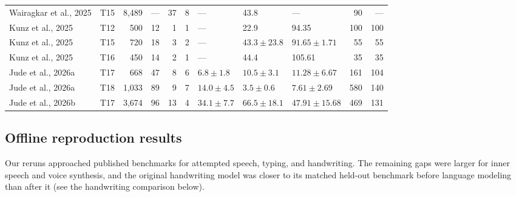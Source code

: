 \documentclass[11pt]{article}
\begin{document}
\begin{table}[t]
\begin{tabular}{@{}>{\raggedright\arraybackslash}p{3.50cm}lrrrrlllrr@{}}
Wairagkar et al., 2025 \cite{wairagkar2025} & T15 & 8{,}489 & --- & 37 & 8 & --- & 43.8 & --- & 90 & --- \\
Kunz et al., 2025 \cite{kunz2025} & T12 & 500 & 12 & 1 & 1 & --- & 22.9 & 94.35 & 100 & 100 \\
Kunz et al., 2025 \cite{kunz2025} & T15 & 720 & 18 & 3 & 2 & --- & $43.3{\pm}23.8$ & $91.65{\pm}1.71$ & 55 & 55 \\
Kunz et al., 2025 \cite{kunz2025} & T16 & 450 & 14 & 2 & 1 & --- & 44.4 & 105.61 & 35 & 35 \\
Jude et al., 2026a \cite{jude2026typing} & T17 & 668 & 47 & 8 & 6 & $6.8{\pm}1.8$ & $10.5{\pm}3.1$ & $11.28{\pm}6.67$ & 161 & 104 \\
Jude et al., 2026a \cite{jude2026typing} & T18 & 1{,}033 & 89 & 9 & 7 & $14.0{\pm}4.5$ & $3.5{\pm}0.6$ & $7.61{\pm}2.69$ & 580 & 140 \\
Jude et al., 2026b \cite{jude2026lis} & T17 & 3{,}674 & 96 & 13 & 4 & $34.1{\pm}7.7$ & $66.5{\pm}18.1$ & $47.91{\pm}15.68$ & 469 & 131 \\
\bottomrule
\end{tabular}
\end{table}

\subsection{Offline reproduction results}

Our reruns approached published benchmarks for attempted speech,
typing, and handwriting. The remaining gaps were larger for inner
speech and voice synthesis, and the original handwriting model was
closer to its matched held-out benchmark before language modeling than
after it (see the handwriting comparison below).
\end{document}
